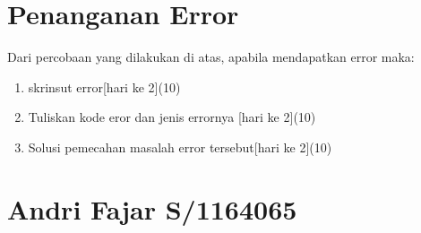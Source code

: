 \section{Penanganan Error}
Dari percobaan yang dilakukan di atas, apabila mendapatkan error maka:

\begin{enumerate}
	\item
	skrinsut error[hari ke 2](10)
	\item
Tuliskan kode eror dan jenis errornya [hari ke 2](10)
	\item
Solusi pemecahan masalah error tersebut[hari ke 2](10)

\end{enumerate}

\section{Andri Fajar S/1164065}
